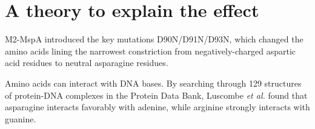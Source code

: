 \section{A theory to explain the effect}

M2-MspA introduced the key mutations D90N/D91N/D93N, which changed the amino acids lining the narrowest constriction from negatively-charged aspartic acid residues to neutral asparagine residues.

Amino acids can interact with DNA bases.  By searching through 129 structures of protein-DNA complexes in the Protein Data Bank, Luscombe \textit{et al.} \citep{Luscombe2001} found that asparagine interacts favorably with adenine, while arginine strongly interacts with guanine.